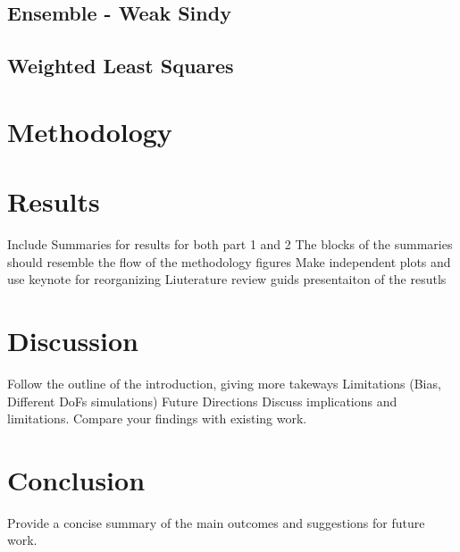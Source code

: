 \documentclass[final,3p,10.5pt]{elsarticle}
\begin{document}
\subsection{Ensemble - Weak Sindy}
\subsection{Weighted Least Squares}

\section{Methodology}

\section{Results}

 \nocite{*}


Include Summaries for results for both part 1 and 2
The blocks of the summaries should resemble the flow of the methodology figures
Make independent plots and use keynote for reorganizing
Liuterature review guids presentaiton of the resutls

\section{Discussion}

Follow the outline of the introduction, giving more takeways
Limitations (Bias, Different DoFs simulations)
Future Directions 
Discuss implications and limitations. 
Compare your findings with existing work.

\section{Conclusion}

Provide a concise summary of the main outcomes and suggestions for future work.


\end{document}

